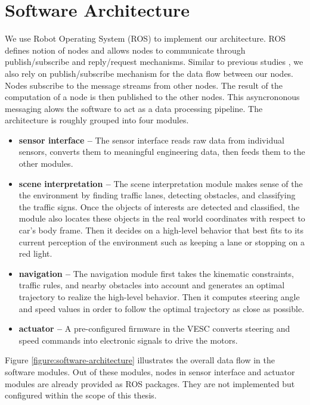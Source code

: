 \section{Software Architecture}

We use Robot Operating System (ROS) \cite{Quigley2009ROSAO} to implement our
architecture. ROS defines notion of nodes and allows nodes to communicate
through publish/subscribe and reply/request mechanisms. Similar to previous
studies \cite{ Thrun2006StanleyTR, Montemerlo2009JuniorTS, Kato2018AutowareOB},
we also rely on publish/subscribe mechanism for the data flow between our
nodes. Nodes subscribe to the message streams from other nodes. The result of
the computation of a node is then published to the other nodes. This
asyncrononous messaging alows the software to act as a data processing
pipeline. The architecture is roughly grouped into four modules.

\begin{itemize}
  \item \textbf{sensor interface --} The sensor interface reads raw data from
    individual sensors, converts them to meaningful engineering data, then
    feeds them to the other modules.
  \item \textbf{scene interpretation --} The scene interpretation module
    makes sense of the the environment by finding traffic lanes,
    detecting obstacles, and classifying the traffic signs. Once the
    objects of interests are detected and classified, the module also
    locates these objects in the real world coordinates with respect to
    car's body frame. Then it decides on a high-level behavior that best
    fits to its current perception of the environment such as keeping a
    lane or stopping on a red light.
  \item \textbf{navigation --} The navigation module first takes the
    kinematic constraints, traffic rules, and nearby obstacles into account
    and generates an optimal trajectory to realize the high-level behavior.
    Then it computes steering angle and speed values in order to follow the
    optimal trajectory as close as possible.
  \item \textbf{actuator --} A pre-configured firmware in the VESC converts
    steering and speed commands into electronic signals to drive the
    motors.
\end{itemize}

Figure \ref{figure:software-architecture} illustrates the overall data flow in
the software modules. Out of these modules, nodes in sensor interface and
actuator modules are already provided as ROS packages. They are not implemented
but configured within the scope of this thesis.

